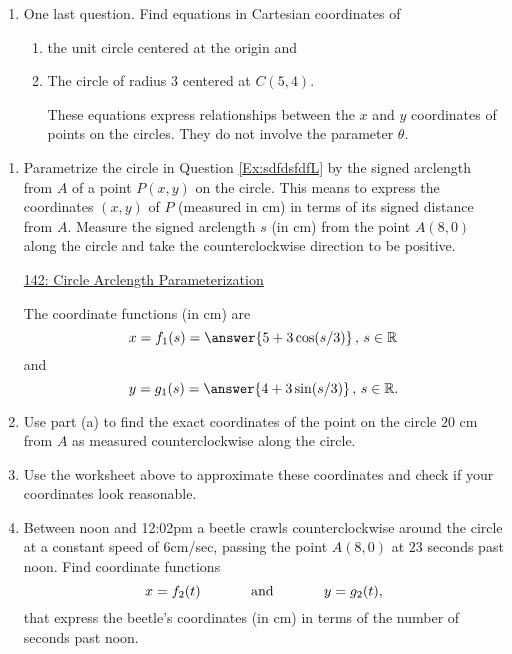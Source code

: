 \documentclass{ximera}
\begin{document}
\begin{question}
\begin{explanation}
\begin{enumerate}
\item One last question. Find equations in Cartesian coordinates of 

\begin{enumerate}
\item the unit circle centered at the origin and 

\item The circle of radius $3$ centered at  $C(5,4)$.

These equations express relationships between the $x$ and $y$ coordinates of points on the circles. They do not involve the parameter $\theta$. 

\end{enumerate}
\end{enumerate}

\end{explanation}
\end{question}


\begin{question}  \label{QDF09dfdfLKDD}
\begin{enumerate}

\item Parametrize the circle in Question \ref{Ex:sdfdsfdfL} by the signed arclength from $A$ of a point $P(x,y)$ on the circle. This means to express the coordinates $(x,y)$ of $P$ (measured in cm) in terms of its signed distance from $A$. Measure the signed arclength $s$ (in cm)  from the point $A(8,0)$ along the circle and take the counterclockwise direction to be positive. 

\begin{onlineOnly}
    \begin{center}
\end{center}
\end{onlineOnly}

\href{https://www.desmos.com/calculator/llrzcv5ckf}{142: Circle Arclength Parameterization}



The coordinate functions (in cm) are 
\[
  x = f_1(s) = \answer{5 + 3 \cos(s/3)} \, , \, s\in \mathbb{R}
\]
and
\[
   y = g_1(s) = \answer{4 + 3 \sin(s/3)} \, , \, s\in \mathbb{R} .
\]

\item Use part (a) to find the exact coordinates of the point on the circle  $20$ cm from $A$ as measured counterclockwise along the circle. 

\item Use the worksheet above to approximate these coordinates and check if your coordinates look reasonable.

\item Between noon and 12:02pm a beetle crawls counterclockwise around the circle at a constant speed of $6$cm/sec, passing the point $A(8,0)$ at $23$ seconds past noon. Find coordinate functions
\[
   x = f_2(t)  \hskip 0.5 in \text{and} \hskip 0.5in  y=g_2(t) ,
\] 
that express the beetle's coordinates (in cm) in terms of the number of seconds past noon.

\end{enumerate}
\end{question}
\end{document}
